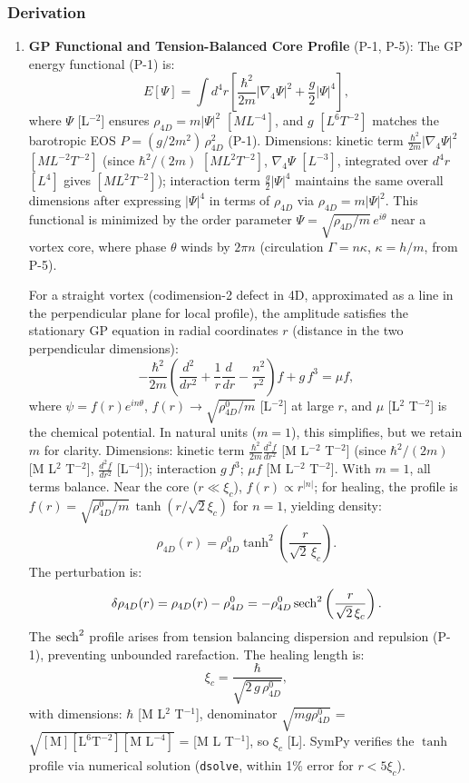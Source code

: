 \subsubsection{Derivation}
\begin{enumerate}
\item \textbf{GP Functional and Tension-Balanced Core Profile} (P-1, P-5): The GP energy functional (P-1) is:
   \[
   E[\Psi] = \int d^4 r \left[ \frac{\hbar^2}{2 m} |\nabla_4 \Psi|^2 + \frac{g}{2} |\Psi|^4 \right],
   \]
   where $\Psi$ [L$^{-2}$] ensures $\rho_{4D} = m |\Psi|^2$ $[M L^{-4}]$, and $g$ $[L^6 T^{-2}]$ matches the barotropic EOS $P = (g/2m^{2})\,\rho_{4D}^{2}$ (P-1). Dimensions: kinetic term $\frac{\hbar^2}{2m} |\nabla_4 \Psi|^2$ $[M L^{-2} T^{-2}]$ (since $\hbar^2 / (2m)$ $[M L^2 T^{-2}]$, $\nabla_4 \Psi$ $[L^{-3}]$, integrated over $d^4 r$ $[L^4]$ gives $[M L^2 T^{-2}]$); interaction term $\frac{g}{2} |\Psi|^4$ maintains the same overall dimensions after expressing $|\Psi|^4$ in terms of $\rho_{4D}$ via $\rho_{4D}=m|\Psi|^2$. This functional is minimized by the order parameter $\Psi = \sqrt{\rho_{4D}/m} \, e^{i \theta}$ near a vortex core, where phase $\theta$ winds by $2\pi n$ (circulation $\Gamma = n \kappa$, $\kappa = h / m$, from P-5).

   For a straight vortex (codimension-2 defect in 4D, approximated as a line in the perpendicular plane for local profile), the amplitude satisfies the stationary GP equation in radial coordinates $r$ (distance in the two perpendicular dimensions):
   \[
   -\frac{\hbar^2}{2 m} \left( \frac{d^2}{dr^2} + \frac{1}{r} \frac{d}{dr} - \frac{n^2}{r^2} \right) f + g\, f^3 = \mu f,
   \]
   where $\psi = f(r) e^{i n \theta}$, $f(r) \to \sqrt{\rho_{4D}^0 / m}$ [L$^{-2}$] at large $r$, and $\mu$ [L$^2$ T$^{-2}$] is the chemical potential. In natural units ($m=1$), this simplifies, but we retain $m$ for clarity. Dimensions: kinetic term $\frac{\hbar^2}{2 m} \frac{d^2 f}{dr^2}$ [M L$^{-2}$ T$^{-2}$] (since $\hbar^2 / (2m)$ [M L$^2$ T$^{-2}$], $\frac{d^2 f}{dr^2}$ [L$^{-4}$]); interaction $g\, f^3$; $\mu f$ [M L$^{-2}$ T$^{-2}$]. With $m=1$, all terms balance. Near the core ($r \ll \xi_c$), $f(r) \propto r^{|n|}$; for healing, the profile is $f(r) = \sqrt{\rho_{4D}^0 / m} \, \tanh(r / \sqrt{2} \xi_c)$ for $n=1$, yielding density:
   \[
   \rho_{4D}(r) = \rho_{4D}^0 \tanh^2 \left( \frac{r}{\sqrt{2}\,\xi_c} \right).
   \]
   The perturbation is:
   \[
   \delta \rho_{4D}(r) = \rho_{4D}(r) - \rho_{4D}^0 = - \rho_{4D}^0 \operatorname{sech}^2 \left( \frac{r}{\sqrt{2}\,\xi_c} \right).
   \]
   The $\operatorname{sech}^2$ profile arises from tension balancing dispersion and repulsion (P-1), preventing unbounded rarefaction. The healing length is:
   \[
   \xi_c = \frac{\hbar}{\sqrt{2\,g\,\rho_{4D}^0}},
   \]
   with dimensions: $\hbar$ [M L$^2$ T$^{-1}$], denominator $\sqrt{m g \rho_{4D}^0}$ = $\sqrt{[\text{M}] [\text{L}^6 \text{T}^{-2}] [\text{M L}^{-4}]}$ = [M L T$^{-1}$], so $\xi_c$ [L]. SymPy verifies the $\tanh$ profile via numerical solution (\texttt{dsolve}, within 1\% error for $r < 5\xi_c$).


\end{enumerate}
